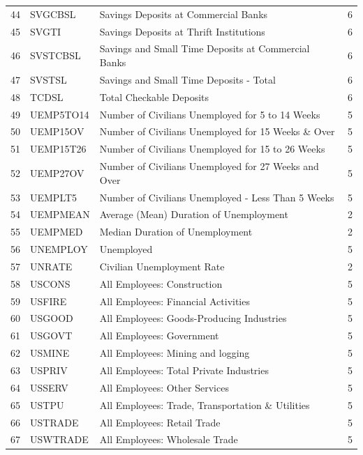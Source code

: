 \documentclass[12pt,letterpaper,leqno,doublespacing]{article}
\begin{document}
\begin{appendices}
{{\begin{tabularx}{\textwidth}{llZc}
            44 & SVGCBSL & Savings Deposits at Commercial Banks & 6 \\
            45 & SVGTI & Savings Deposits at Thrift Institutions & 6 \\
            46 & SVSTCBSL & Savings and Small Time Deposits at Commercial Banks & 6 \\
            47 & SVSTSL & Savings and Small Time Deposits - Total & 6 \\
            48 & TCDSL & Total Checkable Deposits & 6 \\
            49 & UEMP5TO14 & Number of Civilians Unemployed for 5 to 14 Weeks & 5 \\
            50 & UEMP15OV & Number of Civilians Unemployed for 15 Weeks \& Over & 5 \\
            51 & UEMP15T26 & Number of Civilians Unemployed for 15 to 26 Weeks & 5 \\
            52 & UEMP27OV & Number of Civilians Unemployed for 27 Weeks and Over & 5 \\
            53 & UEMPLT5 & Number of Civilians Unemployed - Less Than 5 Weeks & 5 \\
            54 & UEMPMEAN & Average (Mean) Duration of Unemployment & 2 \\
            55 & UEMPMED & Median Duration of Unemployment & 2 \\
            56 & UNEMPLOY & Unemployed & 5 \\
            57 & UNRATE & Civilian Unemployment Rate & 2 \\
            58 & USCONS & All Employees: Construction & 5 \\
            59 & USFIRE & All Employees: Financial Activities & 5 \\
            60 & USGOOD & All Employees: Goods-Producing Industries & 5 \\
            61 & USGOVT & All Employees: Government & 5 \\
            62 & USMINE & All Employees: Mining and logging & 5 \\
            63 & USPRIV & All Employees: Total Private Industries & 5 \\
            64 & USSERV & All Employees: Other Services & 5 \\
            65 & USTPU & All Employees: Trade, Transportation \& Utilities & 5 \\
            66 & USTRADE & All Employees: Retail Trade & 5 \\
            67 & USWTRADE & All Employees: Wholesale Trade & 5 \\
            \bottomrule
        \end{tabularx}
    }
}

\end{appendices}
\end{document}
